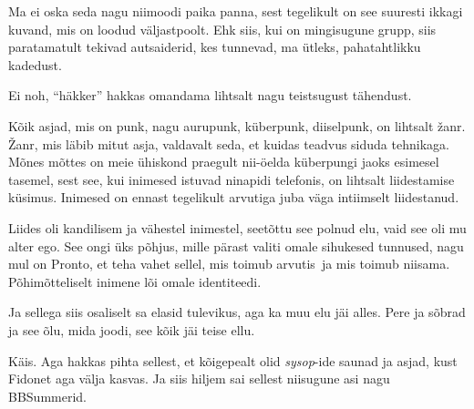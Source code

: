 
Ma ei oska seda nagu niimoodi paika panna, sest tegelikult on see suuresti 
ikkagi kuvand, mis on loodud väljastpoolt. Ehk siis, kui on mingisugune grupp, 
siis paratamatult tekivad  autsaiderid, kes tunnevad, ma ütleks, pahatahtlikku 
kadedust. 


Ei noh, \enquote{häkker} hakkas omandama lihtsalt nagu teistsugust tähendust.


Kõik asjad, mis on punk, nagu aurupunk, küberpunk, diiselpunk, on lihtsalt 
žanr. Žanr, mis läbib mitut asja, valdavalt seda, et kuidas teadvus siduda 
tehnikaga. Mõnes mõttes on meie ühiskond praegult nii-öelda küberpungi jaoks 
esimesel tasemel, sest see, kui inimesed istuvad ninapidi telefonis, on 
lihtsalt liidestamise küsimus. Inimesed on ennast tegelikult arvutiga juba väga 
intiimselt liidestanud.


Liides oli kandilisem ja vähestel inimestel, seetõttu see polnud elu, vaid see 
oli mu alter ego. See ongi üks põhjus, mille pärast valiti omale sihukesed 
tunnused, nagu mul on Pronto, et teha vahet sellel, mis toimub arvutis ja mis 
toimub niisama. Põhimõtteliselt inimene lõi omale identiteedi. 


Ja sellega siis osaliselt sa elasid tulevikus, aga ka muu elu jäi alles. Pere 
ja  sõbrad ja see õlu, mida joodi, see kõik jäi teise ellu.


Käis. Aga hakkas pihta sellest, et kõigepealt olid \emph{sysop}-ide saunad ja 
asjad, kust Fidonet aga välja kasvas. Ja siis hiljem sai sellest niisugune asi 
nagu BBSummerid.
                 
                 
